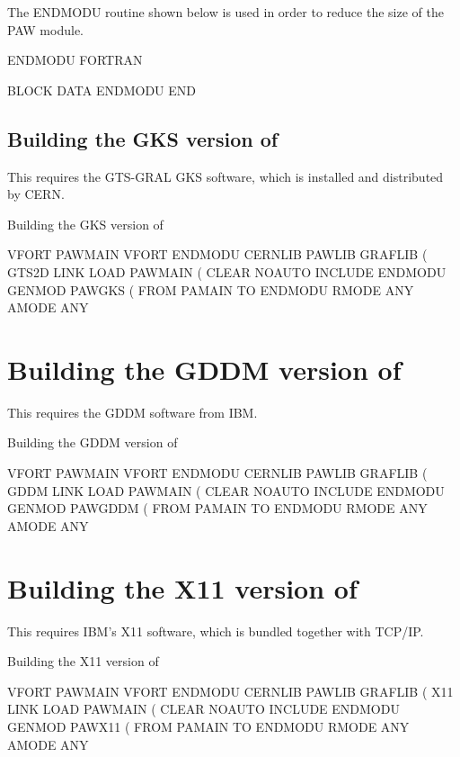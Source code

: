 The ENDMODU routine shown below is used in order to reduce the size of the PAW
module. 
 
\begin{XMPt}{ENDMODU FORTRAN}

      BLOCK DATA ENDMODU
      END

\end{XMPt}
 
\subsection{Building the GKS version of \PAW{}}

This requires the GTS-GRAL GKS software, which is installed and distributed 
by CERN.


\begin{XMPt}{Building the GKS version of \PAW{}}

 VFORT PAWMAIN
 VFORT ENDMODU 
 CERNLIB PAWLIB GRAFLIB ( GTS2D LINK
 LOAD PAWMAIN ( CLEAR NOAUTO
 INCLUDE ENDMODU
 GENMOD PAWGKS  ( FROM PAMAIN TO ENDMODU RMODE ANY AMODE ANY
 
\end{XMPt}

\section{Building the GDDM version of \PAW{}}

This requires the GDDM software from IBM.

 
\begin{XMPt}{Building the GDDM version of \PAW{}}

 VFORT PAWMAIN
 VFORT ENDMODU
 CERNLIB PAWLIB GRAFLIB ( GDDM LINK
 LOAD PAWMAIN ( CLEAR NOAUTO
 INCLUDE ENDMODU
 GENMOD PAWGDDM ( FROM PAMAIN TO ENDMODU RMODE ANY AMODE ANY
 
\end{XMPt}

\section{Building the X11 version of \PAW{}}

This requires IBM's X11 software, which is bundled together with TCP/IP.

\begin{XMPt}{Building the X11 version of \PAW{}}

 VFORT PAWMAIN
 VFORT ENDMODU
 CERNLIB PAWLIB GRAFLIB ( X11 LINK
 LOAD PAWMAIN ( CLEAR NOAUTO
 INCLUDE ENDMODU
 GENMOD PAWX11  ( FROM PAMAIN TO ENDMODU RMODE ANY AMODE ANY
 
\end{XMPt}

